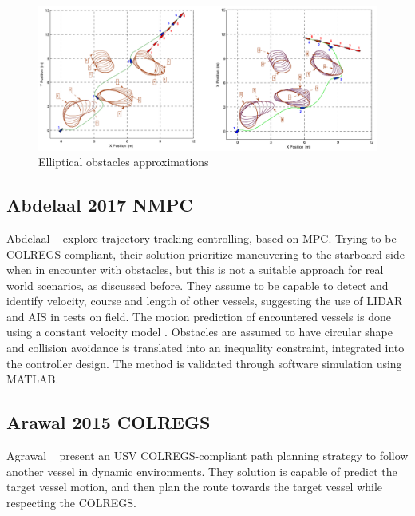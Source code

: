     \begin{figure}[H]
        \centering
        \includegraphics[scale=0.3]{figs/Chap3/Soltan2009Trajectory_SimulateTests_Ellipsses.png}
        \caption{Elliptical obstacles approximations \cite{Soltan2009Trajectory}}
        \label{fig:Soltan2009Trajectory_SimulateTests_Ellipsses}
    \end{figure}
    
    
    \subsection{Abdelaal 2017 NMPC}
    Abdelaal \etal~\cite{Abdelaal2017NMPC, Abdelaal2018Nonlinear} explore trajectory tracking controlling, based on \ac{MPC}. Trying to be COLREGS-compliant, their solution prioritize maneuvering to the starboard side when in encounter with obstacles, but this is not a suitable approach for real world scenarios, as discussed before. They assume to be capable to detect and identify velocity, course and length of other vessels, suggesting the use of \ac{LIDAR} and \ac{AIS} in tests on field. The motion prediction of encountered vessels is done using a constant velocity model \cite{Rong2003Survey}. Obstacles are assumed to have circular shape and collision avoidance is translated into an inequality constraint, integrated into the controller design. The method is validated through software simulation using MATLAB.
    
    \subsection{Arawal 2015 COLREGS}
    Agrawal \etal~\cite{Agrawal2015COLREGS} present an \ac{USV} COLREGS-compliant path planning strategy to follow another vessel in dynamic environments. They solution is capable of predict the target vessel motion, and then plan the route towards the target vessel while respecting the COLREGS. 
    
